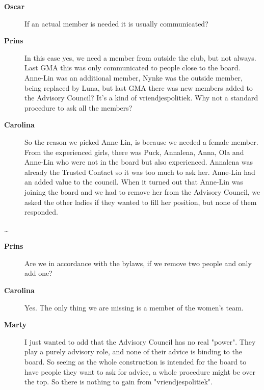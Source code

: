 \documentclass[12pt, a4paper]{article}
\newcommand{\speak}[2]{\begin{description}\item[\textbf{#1}]#2\end{description}}
\begin{document}
\speak{Oscar}{If an actual member is needed it is usually communicated?}

\speak{Prins}{In this case yes, we need a member from outside the club, but not always. Last GMA this was only communicated to people close to the board. Anne-Lin was an additional member, Nynke was the outside member, being replaced by Luna, but last GMA there was new members added to the Advisory Council? It's a kind of vriendjespolitiek. Why not a standard procedure to ask all the members?}





\speak{Carolina}{So the reason we picked Anne-Lin, is because we needed a female member. From the experienced girls, there was Puck, Annalena, Anna, Ola and Anne-Lin who were not in the board but also experienced. Annalena was already the Trusted Contact so it was too much to ask her. Anne-Lin had an added value to the council. When it turned out that Anne-Lin was joining the board and we had to remove her from the Advisory Council, we asked the other ladies if they wanted to fill her position, but none of them responded.}

\dots

\speak{Prins}{Are we in accordance with the bylaws, if we remove two people and only add one?}

\speak{Carolina}{Yes. The only thing we are missing is a member of the women's team.}

\speak{Marty}{I just wanted to add that the Advisory Council has no real "power". They play a purely advisory role, and none of their advice is binding to the board. So seeing as the whole construction is intended for the board to have people they want to ask for advice, a whole procedure might be over the top. So there is nothing to gain from "vriendjespolitiek".}


\end{document}
